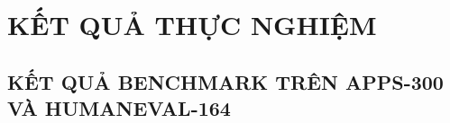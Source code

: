 \chapter{KẾT QUẢ THỰC NGHIỆM}
\label{chap:ketqua}

\section{KẾT QUẢ BENCHMARK TRÊN APPS-300 VÀ HUMANEVAL-164}

